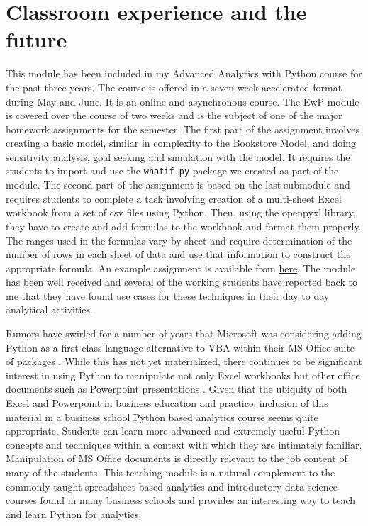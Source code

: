 \documentclass[ited,blindrev]{informs3}              %
\newcommand{\code}[1]{\texttt{#1}}
\begin{document}

\section{Classroom experience and the future}

This module has been included in my Advanced Analytics with Python course for the past three years. The course is offered in a seven-week accelerated format during May and June. It is an online and asynchronous course. The EwP module is covered over the course of two weeks and is the subject of one of the major homework assignments for the semester. The first part of the assignment involves creating a basic model, similar in complexity to the Bookstore Model, and doing sensitivity analysis, goal seeking and simulation with the model. It requires the students to import and use the \code{whatif.py} package we created as part of the module. The second part of the assignment is based on the last submodule and requires  students to complete a task involving creation of a multi-sheet Excel workbook from a set of csv files using Python. Then, using the openpyxl library, they have to create and add formulas to the workbook and format them properly. The ranges used in the formulas vary by sheet and require determination of the number of rows in each sheet of data and use that information to construct the appropriate formula. An example assignment is available from \href{some.url}{here}. The module has been well received and several of the working students have reported back to me that they have found use cases for these techniques in their day to day analytical activities.

Rumors have swirled for a number of years that Microsoft was considering adding Python as a first class language alternative to VBA within their MS Office suite of packages \cite{MicrosoftConsidersAdding}. While this has not yet materialized, there continues to be significant interest in using Python to manipulate not only Excel workbooks but other office documents such as Powerpoint presentations \cite{PythonpptxPythonpptx21}. Given that the ubiquity of both Excel and Powerpoint in business education and practice, inclusion of this material in a business school Python based analytics course seems quite appropriate. Students can learn more advanced and extremely useful Python concepts and techniques within a context with which they are intimately familiar. Manipulation of MS Office documents is directly relevant to the job content of many of the students. This teaching module is a natural complement to the commonly taught spreadsheet based analytics and introductory data science courses found in many business schools and provides an interesting way to teach and learn Python for analytics.
\end{document}
